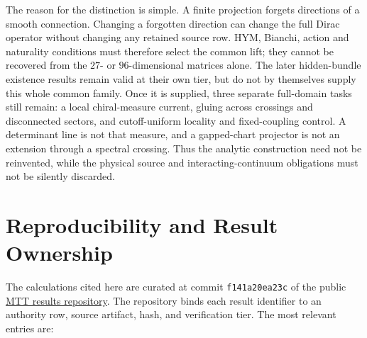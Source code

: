 \documentclass[11pt]{article}
\begin{document}
The reason for the distinction is simple.  A finite projection forgets
directions of a smooth connection.  Changing a forgotten direction can change
the full Dirac operator without changing any retained source row.  HYM, Bianchi,
action and naturality conditions must therefore select the common lift; they
cannot be recovered from the $27$- or $96$-dimensional matrices alone.
The later hidden-bundle existence results remain valid at their own tier, but
do not by themselves supply this whole common family.  Once it is supplied,
three separate full-domain tasks still remain: a local chiral-measure current,
gluing across crossings and disconnected sectors, and cutoff-uniform locality
and fixed-coupling control.  A determinant line is not that measure, and a
gapped-chart projector is not an extension through a spectral crossing.
Thus the analytic construction need not be reinvented, while the physical
source and interacting-continuum obligations must not be silently discarded.

\section{Reproducibility and Result Ownership}
\label{sec:repro}

The calculations cited here are curated at commit
\texttt{f141a20ea23c} of the public
\href{https://github.com/PeterNero/mtt-results-repro/tree/f141a20ea23c5c3ff19cc2161c0e226e29ade8a7}{MTT results repository}.
The repository binds each result identifier to an authority row, source artifact, hash, and
verification tier.  The most relevant entries are:
\end{document}
